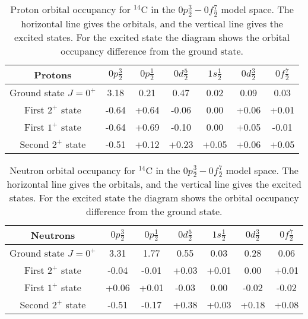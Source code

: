 \begin{table}
\begin{center}
\begin{tabular}{|c|c|c|c|c|c|c|}
	\hline
	Protons & $0p\frac32$ & $0p\frac12$ & $0d\frac52$ & $1s\frac12$ & $0d\frac32$ & $0f\frac72$  \\
	\hline
	Ground state $J=0^+$ & 3.18 & 0.21 & 0.47 & 0.02 & 0.09 & 0.03 \\
	\hline
	First $2^+$ state & -0.64 & +0.64 & -0.06 & 0.00 & +0.06 & +0.01 \\
	\hline
	First $1^+$ state & -0.64 & +0.69 & -0.10 & 0.00 & +0.05 & -0.01 \\
	\hline
	Second $2^+$ state & -0.51 & +0.12 & +0.23 & +0.05 & +0.06 & +0.05 \\
	\hline
\end{tabular}
\caption{Proton orbital occupancy for $^{14}$C in the $0p\frac32-0f\frac72$ model space. The horizontal line gives the orbitals, and the vertical line gives the excited states. For the excited state the diagram shows the orbital occupancy difference from the ground state.}
\label{C14_0f7_p}
\end{center}
\end{table}

\begin{table}
\begin{center}
\begin{tabular}{|c|c|c|c|c|c|c|}
	\hline
	Neutrons & $0p\frac32$ & $0p\frac12$ & $0d\frac52$ & $1s\frac12$ & $0d\frac32$ & $0f\frac72$  \\
	\hline
	Ground state $J=0^+$ & 3.31 & 1.77 & 0.55 & 0.03 & 0.28 & 0.06 \\
	\hline
	First $2^+$ state & -0.04 & -0.01 & +0.03 & +0.01 & 0.00 & +0.01 \\
	\hline
	First $1^+$ state & +0.06 & +0.01 & -0.03 & 0.00 & -0.02 & -0.02 \\
	\hline
	Second $2^+$ state & -0.51 & -0.17 & +0.38 & +0.03 & +0.18 & +0.08 \\
	\hline
\end{tabular}
\caption{Neutron orbital occupancy for $^{14}$C in the $0p\frac32-0f\frac72$ model space. The horizontal line gives the orbitals, and the vertical line gives the excited states. For the excited state the diagram shows the orbital occupancy difference from the ground state.}
\label{C14_0f7_n}
\end{center}
\end{table}

\clearpage
